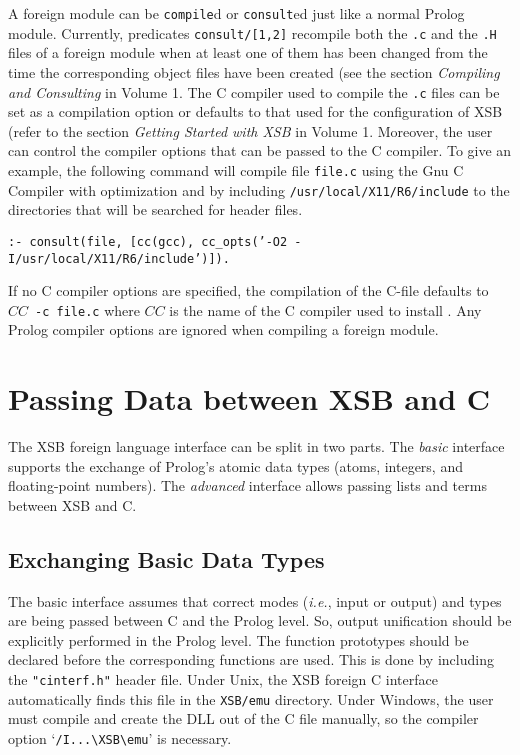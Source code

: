 A foreign module can be {\tt compile}d or {\tt consult}ed just like a
normal Prolog module.  Currently, predicates {\tt consult/[1,2]}
recompile both the {\tt *.c} and the {\tt *.H} files of a foreign
module when at least one of them has been changed from the time the
corresponding object files have been created (see the section {\it
Compiling and Consulting} in Volume 1. 
The C compiler used to compile the {\tt *.c} files can be set as a
compilation option or defaults to that used for the configuration of
XSB (refer to the section {\it Getting Started with XSB} in Volume 1.
Moreover, the user can control the compiler options that can be passed
to the C compiler.  To give an example, the following command will
compile file {\tt file.c} using the Gnu C Compiler with optimization
and by including {\tt /usr/local/X11/R6/include} to the directories that
will be searched for header files.
\begin{center}
{\tt  :- consult(file,
                 [cc(gcc), cc\_opts('-O2 -I/usr/local/X11/R6/include')]). }
\end{center}
If no C compiler options are specified, the compilation of the C-file
defaults to $CC$~{\tt -c~file.c} where $CC$ is the name of the C compiler
used to install \ourprolog.
Any Prolog compiler options are ignored when compiling a foreign module.


\section{Passing Data between XSB and C}

The XSB foreign language interface can be split in two parts.
The \emph{basic} interface supports the exchange of Prolog's 
atomic data types (atoms, integers, and floating-point numbers). 
The \emph{advanced} interface allows passing lists and terms between XSB
and C.

\subsection{Exchanging Basic Data Types}
The basic interface assumes that correct modes ({\it i.e.}, input or
output) and types are being passed between C and the Prolog level.  So,
output unification should be explicitly performed in the Prolog level.  The
function prototypes should be declared before the corresponding functions
are used.  This is done by including the {\tt "cinterf.h"} header file.
Under Unix, the XSB foreign C interface automatically finds this file in
the {\tt XSB/emu} directory. Under Windows, the user must compile and
create the DLL out of the C file manually, so the compiler option
`\verb|/I...\XSB\emu|' is necessary.

